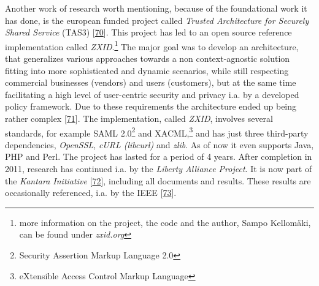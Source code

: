 \documentclass[12pt,english,a4paper,titlepage,cleardoublepage=empty,dottedtoc]{report}
\begin{document}
Another work of research worth mentioning, because of the foundational
work it has done, is the european funded project called \emph{Trusted
Architecture for Securely Shared Service} (TAS3)
{[}\protect\hyperlink{ref-web_2011_tas3-project}{70}{]}. This project
has led to an open source reference implementation called
\emph{ZXID}.\footnote{more information on the project, the code and the
  author, Sampo Kellomäki, can be found under \emph{zxid.org}} The major
goal was to develop an architecture, that generalizes various approaches
towards a non context-agnostic solution fitting into more sophisticated
and dynamic scenarios, while still respecting commercial businesses
(vendors) and users (customers), but at the same time facilitating a
high level of user-centric security and privacy i.a. by a developed
policy framework. Due to these requirements the architecture ended up
being rather complex
{[}\protect\hyperlink{ref-graphic_2011_architecture_components-of-organization-domain}{71}{]}.
The implementation, called \emph{ZXID}, involves several standards, for
example SAML 2.0\footnote{Security Assertion Markup Language 2.0} and
XACML,\footnote{eXtensible Access Control Markup Language} and has just
three third-party dependencies, \emph{OpenSSL}, \emph{cURL (libcurl)}
and \emph{zlib}. As of now it even supports Java, PHP and Perl. The
project has lasted for a period of 4 years. After completion in 2011,
research has continued i.a. by the \emph{Liberty Alliance Project}. It
is now part of the \emph{Kantara Initiative}
{[}\protect\hyperlink{ref-web_kantara-initiative}{72}{]}, including all
documents and results. These results are occasionally referenced, i.a.
by the IEEE
{[}\protect\hyperlink{ref-paper_2014_personal-data-store-approach}{73}{]}.
\end{document}
